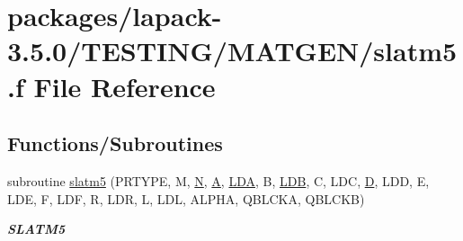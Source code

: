 \hypertarget{slatm5_8f}{}\section{packages/lapack-\/3.5.0/\+T\+E\+S\+T\+I\+N\+G/\+M\+A\+T\+G\+E\+N/slatm5.f File Reference}
\label{slatm5_8f}
\subsection*{Functions/\+Subroutines}
\begin{DoxyCompactItemize}
\item 
subroutine \hyperlink{group__real__matgen_ga6c74139d5b1727c2b6a4ade4c349bd6b}{slatm5} (P\+R\+T\+Y\+P\+E, M, \hyperlink{polmisc_8c_a0240ac851181b84ac374872dc5434ee4}{N}, \hyperlink{classA}{A}, \hyperlink{example__user_8c_ae946da542ce0db94dced19b2ecefd1aa}{L\+D\+A}, B, \hyperlink{example__user_8c_a50e90a7104df172b5a89a06c47fcca04}{L\+D\+B}, C, L\+D\+C, \hyperlink{odrpack_8h_a7dae6ea403d00f3687f24a874e67d139}{D}, L\+D\+D, E, L\+D\+E, F, L\+D\+F, R, L\+D\+R, L, L\+D\+L, A\+L\+P\+H\+A, Q\+B\+L\+C\+K\+A, Q\+B\+L\+C\+K\+B)
\begin{DoxyCompactList}\small\item\em {\bfseries S\+L\+A\+T\+M5} \end{DoxyCompactList}\end{DoxyCompactItemize}

